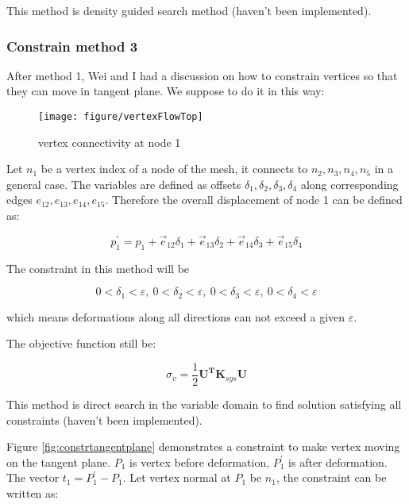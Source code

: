 This method is density guided search method (haven't been implemented).

\subsubsection{Constrain method 3}
After method 1, Wei and I had a discussion on how to constrain vertices so that they can move in tangent plane. We suppose to do it in this way:

\begin{figure}[h!]
	\centering
	\texttt{[image: figure/vertexFlowTop]}
	\caption{vertex connectivity at node 1}
	\label{fig:vertexflowtop}
\end{figure}

Let $ n_1 $ be a vertex index of a node of the mesh, it connects to $ n_2, n_3, n_4, n_5 $ in a general case. The variables are defined as offsets $ \delta_1, \delta_2, \delta_3, \delta_4 $ along corresponding edges $ e_{12}, e_{13}, e_{14}, e_{15} $. Therefore the overall displacement of node 1 can be defined as:

\begin{equation*}
p_1^{'} = p_1 + \vec{e}_{12} \delta_1 + \vec{e}_{13} \delta_2 + \vec{e}_{14} \delta_3 + \vec{e}_{15} \delta_4
\end{equation*}

The constraint in this method will be 

\begin{equation*}
0<\delta_1 < \varepsilon,~ 0<\delta_2 < \varepsilon,~ 0<\delta_3 < \varepsilon,~0<\delta_4 < \varepsilon
\end{equation*}

which means deformations along all directions can not exceed a given $ \varepsilon $.

The objective function still be:

\begin{equation*}
\sigma_v = \dfrac{1}{2} \mathbf{U^T} \mathbf{K}_{sys} \mathbf{U}
\end{equation*}

This method is direct search in the variable domain to find solution satisfying all constraints (haven't been implemented).

Figure \ref{fig:constrtangentplane} demonstrates a constraint to make vertex moving on the tangent plane. $ P_1 $ is vertex before deformation, $ P_1^{'} $ is after deformation. The vector $ t_1 = P_1^{'} - P_1 $. Let vertex normal at $ P_1 $ be $ n_1 $, the constraint can be written as:

